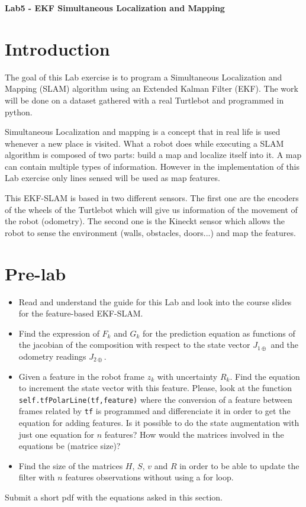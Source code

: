 \documentclass[a4paper,10pt]{article}
\begin{document}
\marginsize{2cm}{2cm}{2cm}{2cm}

\begin{center}
\Large \textbf{Lab5 - EKF Simultaneous Localization and Mapping}
\end{center}

\section{Introduction}
The goal of this Lab exercise is to program a Simultaneous Localization and Mapping (SLAM) algorithm using an Extended Kalman Filter (EKF). The work will be done on a dataset gathered with a real Turtlebot and programmed in python.

Simultaneous Localization and mapping is a concept that in real life is used whenever a new place is visited. What a robot does while executing a SLAM algorithm is composed of two parts: build a map and localize itself into it. A map can contain multiple types of information. However in the implementation of this Lab exercise only lines sensed will be used as map features.

This EKF-SLAM is based in two different sensors. The first one are the encoders of the wheels of the Turtlebot which will give us information of the movement of the robot (odometry). The second one is the Kineckt sensor which allows the robot to sense the environment (walls, obstacles, doors...) and map the features.

\section{Pre-lab}
\begin{itemize}
	\item Read and understand the guide for this Lab and look into the course slides for the feature-based EKF-SLAM.
	\item Find the expression of $F_k$ and $G_k$ for the prediction equation as functions of the jacobian of the composition with respect to the state vector $J_{1\oplus}$ and the odometry readings $J_{2\oplus}$.
	\item Given a feature in the robot frame $z_k$ with uncertainty $R_k$. Find the equation to increment the state vector with this feature. Please, look at the function \texttt{self.tfPolarLine(tf,feature)} where the conversion of a feature between frames related by \texttt{tf} is programmed and differenciate it in order to get the equation for adding features. Is it possible to do the state augmentation with just one equation for $n$ features? How would the matrices involved in the equations be (matrice size)?
	\item Find the size of the matrices $H$, $S$, $v$ and $R$ in order to be able to update the filter with $n$ features observations without using a for loop.
\end{itemize}
Submit a short pdf with the equations asked in this section.
\end{document}
